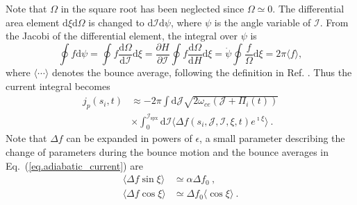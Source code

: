 Note that $\Omega$ in the square root has been  neglected since $\Omega \simeq 0$.
The differential area element $\mathrm{d}\xi\mathrm{d}\Omega$ is changed to $\mathrm{d}\mathcal{I}\mathrm{d}\psi$, where $\psi$ is the angle variable of $\mathcal{I}$.
From the Jacobi of the differential element, the integral over $\psi$ is
\begin{equation}
      \oint f \mathrm{d}\psi = \oint f \frac{\mathrm{d}\Omega}{\mathrm{d}\mathcal{I}}\mathrm{d}\xi = \frac{\partial H}{\partial \mathcal{I}} \oint f \frac{\mathrm{d}\Omega}{\mathrm{d} H}\mathrm{d}\xi = \dot{\psi}\oint \frac{f}{\Omega} \mathrm{d}\xi = 2 \pi \langle f \rangle,
\end{equation}
where $\langle\cdots\rangle$ denotes the bounce average, following the definition in Ref. \cite{berk1999}.
Thus the current integral becomes
\begin{equation}\label{eq.adiabatic_current}
\begin{aligned}
    j_p(s_i,t)  &\approx -  {2\pi} \int\mathrm{d} \mathcal{J}  \sqrt{2\omega_{ce} (\mathcal{J} + \Pi_i(t))} \\
    & \times 
    \int_0^{\mathcal{I}_{\mathrm{s p x}}}\mathrm{d}\mathcal{I}  \langle \Delta f(s_i,\mathcal{J},\mathcal{I},\xi,t)e^{\imath \xi} \rangle  ~.
\end{aligned}
\end{equation}
Note that $\Delta f$ can be expanded in powers of $\epsilon$, a small parameter describing the change of parameters during the bounce motion
and the bounce averages in Eq.~(\ref{eq.adiabatic_current}) are 
 \cite{berk1999} 
\begin{equation}
    \begin{aligned}
    \langle\Delta f \sin \xi \rangle &\simeq \alpha \Delta f_0 ~, \\ 
    \langle \Delta f \cos \xi \rangle &\simeq  \Delta f_0 \langle \cos \xi \rangle ~.
    \end{aligned}
\end{equation}
